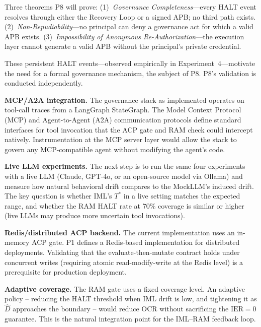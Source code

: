 \documentclass[11pt]{article}
\newcommand{\Dhat}{\widehat{D}}
\newcommand{\IER}{\mathrm{IER}}
\begin{document}
Three theorems P8 will prove:
(1)~\emph{Governance Completeness}---every HALT event resolves through either
the Recovery Loop or a signed APB; no third path exists.
(2)~\emph{Non-Repudiability}---no principal can deny a governance act for
which a valid APB exists.
(3)~\emph{Impossibility of Anonymous Re-Authorization}---the execution layer
cannot generate a valid APB without the principal's private credential.

These persistent HALT events---observed empirically in Experiment~4---motivate
the need for a formal governance mechanism, the subject of P8. P8's validation
is conducted independently.

\textbf{MCP/A2A integration.}
The governance stack as implemented operates on tool-call traces from a
LangGraph StateGraph. The Model Context Protocol (MCP) and Agent-to-Agent
(A2A) communication protocols define standard interfaces for tool invocation
that the ACP gate and RAM check could intercept natively.
Instrumentation at the MCP server layer would allow the stack to govern
any MCP-compatible agent without modifying the agent's code.

\textbf{Live LLM experiments.}
The next step is to run the same four experiments with a live LLM
(Claude, GPT-4o, or an open-source model via Ollama) and measure how
natural behavioral drift compares to the MockLLM's induced drift.
The key question is whether IML's $T^*$ in a live setting matches the
expected range, and whether the RAM HALT rate at 70\% coverage is
similar or higher (live LLMs may produce more uncertain tool invocations).

\textbf{Redis/distributed ACP backend.}
The current implementation uses an in-memory ACP gate.
P1 defines a Redis-based implementation for distributed deployments.
Validating that the evaluate-then-mutate contract holds under concurrent
writes (requiring atomic read-modify-write at the Redis level) is
a prerequisite for production deployment.

\textbf{Adaptive coverage.}
The RAM gate uses a fixed coverage level.
An adaptive policy -- reducing the HALT threshold when IML drift is low,
and tightening it as $\Dhat$ approaches the boundary -- would reduce OCR
without sacrificing the $\IER=0$ guarantee.
This is the natural integration point for the IML--RAM feedback loop.
\end{document}

